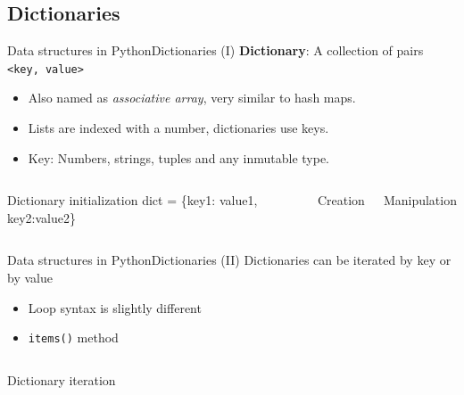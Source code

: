 \documentclass[10pt,compress]{beamer} %
\begin{document}
\subsection{Dictionaries}
\begin{frame}{Data structures in Python}{Dictionaries (I)}
	\textbf{Dictionary}: A collection of pairs \texttt{<key, value>}
		\begin{itemize}
		\item Also named as \textit{associative array}, very similar to hash maps.
		\item Lists are indexed with a number, dictionaries use keys.
		\item Key: Numbers, strings, tuples and any inmutable type.
		\end{itemize}

    \begin{columns}

        \begin{block}{Dictionary initialization}
        dict = \{key1: value1, key2:value2\}
		\end{block}

 	    \scriptsize{
		\begin{exampleblock}{Creation}
		\vspace{-0.2cm}
		
		\vspace{-0.2cm}
		\end{exampleblock}
		\vspace{0.7cm}
        }
 	    \scriptsize{
		\begin{exampleblock}{Manipulation}
		\vspace{-0.2cm}
		
		\vspace{-0.2cm}
		\end{exampleblock}
        }
	\end{columns}
\end{frame}

\begin{frame}{Data structures in Python}{Dictionaries (II)}
	Dictionaries can be iterated by key or by value
		\begin{itemize}
		\item Loop syntax is slightly different
		\item \texttt{items()} method
		\end{itemize}

    \begin{columns}
		\begin{exampleblock}{Dictionary iteration}
		\vspace{-0.2cm}
		
		\vspace{-0.2cm}
		\end{exampleblock}
	\end{columns}
\end{frame}
\end{document}
